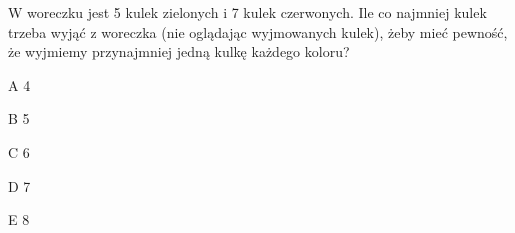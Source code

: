 \begin{tresc}
W woreczku jest 5 kulek zielonych i 7 kulek czerwonych. Ile co najmniej kulek trzeba wyjąć z woreczka (nie oglądając wyjmowanych kulek), żeby mieć pewność, że wyjmiemy przynajmniej jedną kulkę każdego koloru?
\end{tresc}
\begin{wariant}{A} 4 \end{wariant}
\begin{wariant}{B} 5 \end{wariant}
\begin{wariant}{C} 6 \end{wariant}
\begin{wariant}{D} 7 \end{wariant}
\begin{wariant}{E} 8 \end{wariant}
